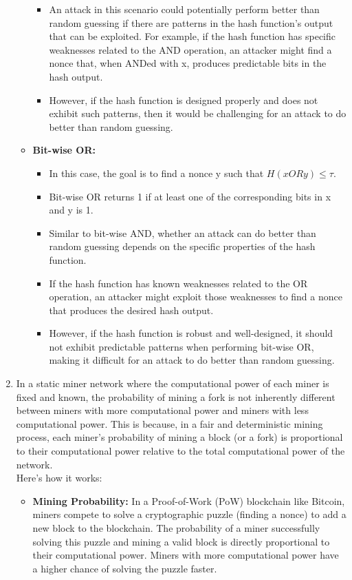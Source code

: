 \documentclass{report}
\begin{document}
\begin{enumerate}
\begin{itemize}
\begin{itemize}
			\item An attack in this scenario could potentially perform better than random guessing if there are patterns in the hash function's output that can be exploited. For example, if the hash function has specific weaknesses related to the AND operation, an attacker might find a nonce that, when ANDed with x, produces predictable bits in the hash output.
			\item However, if the hash function is designed properly and does not exhibit such patterns, then it would be challenging for an attack to do better than random guessing.
		\end{itemize}
		\item \textbf{Bit-wise OR:} 
		\begin{itemize}
			\item In this case, the goal is to find a nonce y such that $H(x OR y) \leq \tau$.
			\item Bit-wise OR returns 1 if at least one of the corresponding bits in x and y is 1.
			\item Similar to bit-wise AND, whether an attack can do better than random guessing depends on the specific properties of the hash function.
			\item If the hash function has known weaknesses related to the OR operation, an attacker might exploit those weaknesses to find a nonce that produces the desired hash output.
			\item However, if the hash function is robust and well-designed, it should not exhibit predictable patterns when performing bit-wise OR, making it difficult for an attack to do better than random guessing.
		\end{itemize}
	\end{itemize}
	\item In a static miner network where the computational power of each miner is fixed and known, the probability of mining a fork is not inherently different between miners with more computational power and miners with less computational power. This is because, in a fair and deterministic mining process, each miner's probability of mining a block (or a fork) is proportional to their computational power relative to the total computational power of the network.\\
	Here's how it works:
	\begin{itemize}
		\item \textbf{Mining Probability:} In a Proof-of-Work (PoW) blockchain like Bitcoin, miners compete to solve a cryptographic puzzle (finding a nonce) to add a new block to the blockchain. The probability of a miner successfully solving this puzzle and mining a valid block is directly proportional to their computational power. Miners with more computational power have a higher chance of solving the puzzle faster.

\end{itemize}
\end{enumerate}
\end{document}
